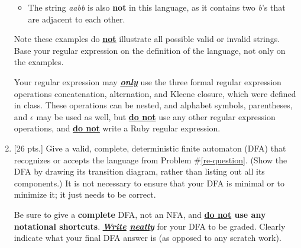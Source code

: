\documentclass[11pt]{article}
\begin{document}
\begin{enumerate}
\begin{itemize}
            \item The string \emph{aabb} is also \textbf{not} in this
                  language, as it contains two \emph{b}'s that are adjacent
                  to each other.

          \end{itemize}

          \vspace{-2.25mm}

          Note these examples do \textbf{\underline{\underline{not}}}
          illustrate all possible valid or invalid strings.  Base your
          regular expression on the definition of the language, not only on
          the examples.

          Your regular expression may \textbf{\underline{\emph{only}}} use
          the three formal regular expression operations concatenation,
          alternation, and Kleene closure, which were defined in class.
          These operations can be nested, and alphabet symbols, parentheses,
          and $\epsilon$ may be used as well, but \textbf{\underline{do
          not}} use any other regular expression operations, and
          \textbf{\underline{\underline{do not}}} write a Ruby regular
          expression.

          \vspace{2.5in}

          \ans[\linewidth]

          \medskip

          \begin{centering}

            \scratchpaper[\linewidth]

          \end{centering}

          \pagebreak


    \item {[26 pts.]} Give a valid, complete, deterministic finite automaton
          (DFA) that recognizes or accepts the language from Problem
          \#\ref{re-question}.  (Show the DFA by drawing its transition
          diagram, rather than listing out all its components.)  It is not
          necessary to ensure that your DFA is minimal or to minimize it;
          it just needs to be correct.

          Be sure to give a \textbf{complete} DFA, not an NFA, and
          \textbf{\underline{do not} use any notational shortcuts}.
          \emph{\textbf{\underline{\underline{Write}}
          \underline{\underline{neatly}}}} for your DFA to be graded.
          Clearly indicate what your final DFA answer is (as opposed to any
          scratch work).


\end{enumerate}
\end{document}
